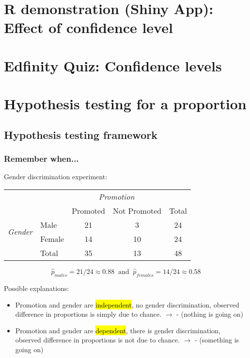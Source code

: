 \documentclass[t,compress,mathserif]{beamer}
\begin{document}

\section{R demonstration (Shiny App): Effect of confidence level}


\section{Edfinity Quiz: Confidence levels}



\section{Hypothesis testing for a proportion}


\subsection{Hypothesis testing framework}


\begin{frame}
\frametitle{Remember when...}

Gender discrimination experiment:

{\footnotesize
\begin{tabular}{ll  cc c} 
  		&				& \multicolumn{2}{c}{\textit{Promotion}} \\
\cline{3-4}
							&			& Promoted	& Not Promoted 	& Total	\\
\cline{2-5}
\multirow{2}{*}{\textit{Gender	}}	&Male 		& 21	 	& 3		& 24 	\\
							&Female		& 14	 	& 10 	 	& 24 \\
\cline{2-5}
							&Total		& 35		& 13		& 48 \\
\end{tabular}
}

\pause

\[ \hat{p}_{males} = 21 / 24 \approx 0.88 ~ \text{ and } ~ \hat{p}_{females} = 14 / 24 \approx 0.58 \]

\pause

Possible explanations:
\begin{itemize}
\item Promotion and gender are \hl{independent}, no gender discrimination, observed difference in proportions is simply due to chance. $\rightarrow$  - {\small (nothing is going on)}
\item Promotion and gender are \hl{dependent}, there is gender discrimination, observed difference in proportions is not due to chance. $\rightarrow$  - {\small (something is going on)}

\end{itemize}

\end{frame}
\end{document}
